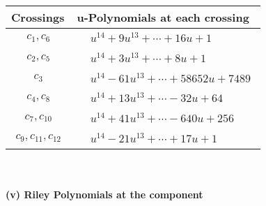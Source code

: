 \documentclass[1p]{elsarticle_modified}
\theoremstyle{definition}
\begin{document}
\begin{tabular}{m{50pt}|m{274pt}}
Crossings & \hspace{64pt}u-Polynomials at each crossing \\
\hline $$\begin{aligned}c_{1},c_{6}\end{aligned}$$&$\begin{aligned}
&u^{14}+9 u^{13}+\cdots+16 u+1
\end{aligned}$\\
\hline $$\begin{aligned}c_{2},c_{5}\end{aligned}$$&$\begin{aligned}
&u^{14}+3 u^{13}+\cdots+8 u+1
\end{aligned}$\\
\hline $$\begin{aligned}c_{3}\end{aligned}$$&$\begin{aligned}
&u^{14}-61 u^{13}+\cdots+58652 u+7489
\end{aligned}$\\
\hline $$\begin{aligned}c_{4},c_{8}\end{aligned}$$&$\begin{aligned}
&u^{14}+13 u^{13}+\cdots-32 u+64
\end{aligned}$\\
\hline $$\begin{aligned}c_{7},c_{10}\end{aligned}$$&$\begin{aligned}
&u^{14}+41 u^{13}+\cdots-640 u+256
\end{aligned}$\\
\hline $$\begin{aligned}c_{9},c_{11},c_{12}\end{aligned}$$&$\begin{aligned}
&u^{14}-21 u^{13}+\cdots+17 u+1
\end{aligned}$\\
\hline
\end{tabular}\\~\\
\newpage\renewcommand{\arraystretch}{1}
\flushleft \textbf{(v) Riley Polynomials at the component}\newline \\
\end{document}
